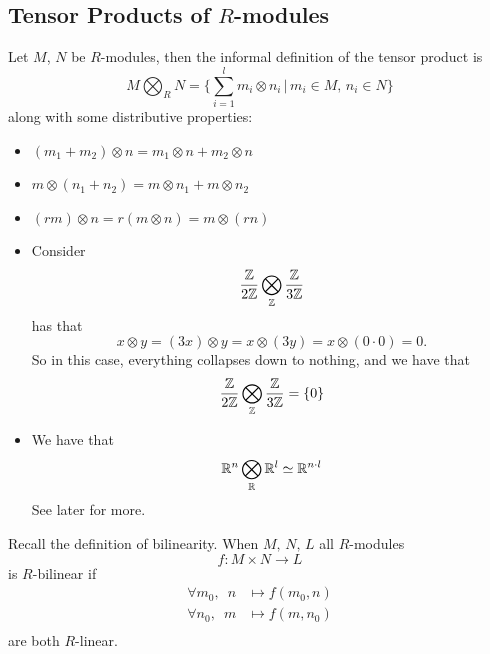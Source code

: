 \documentclass{article}
\begin{document}
\subsection{Tensor Products of $R$-modules}
Let $M$, $N$ be $R$-modules, then the informal definition of the tensor product is \[ M \bigotimes_{R} N= \{\sum_{i=1}^{l} m_{i} \otimes n_{i} \, | \, m_{i} \in M, \, n_{i} \in N \}\]
along with some distributive properties:
\begin{itemize}
    \item $(m_{1} + m_{2}) \otimes n = m_{1} \otimes n + m_{2} \otimes n$
    \item $m \otimes (n_{1} + n_{2}) = m \otimes n_{1} + m \otimes n_{2}$
    \item $(rm) \otimes n = r(m \otimes n) = m \otimes (rn)$
\end{itemize}
\ex \hspace{0.1cm}
\begin{itemize}
    \item Consider \[\frac{\mathbb{Z}}{2\mathbb{Z}} \bigotimes_{\mathbb{Z}} \frac{\mathbb{Z}}{3\mathbb{Z}}\]
has that \[ x \otimes y = (3x) \otimes y = x \otimes (3y) = x \otimes (0\cdot 0) = 0. \] So in this case, everything collapses down to nothing, and we have that \[ \frac{\mathbb{Z}}{2\mathbb{Z}} \bigotimes_{\mathbb{Z}} \frac{\mathbb{Z}}{3\mathbb{Z}} = \{ 0 \}\]
\item We have that \[ \mathbb{R}^{n} \bigotimes_{\mathbb{R}} \mathbb{R}^{l} \simeq \mathbb{R}^{n\cdot l}\] See later for more.
\end{itemize}
Recall the definition of bilinearity. When $M,\, N,\, L$ all $R$-modules \[ f: M \times N \to L \] is $R$-bilinear if
\begin{align*}
    \forall m_{0}, \, \, \, n &\mapsto f(m_{0},n)\\
    \forall n_{0}, \, \, \, m &\mapsto f(m, n_{0})\\
\end{align*}
are both $R$-linear.
\end{document}
